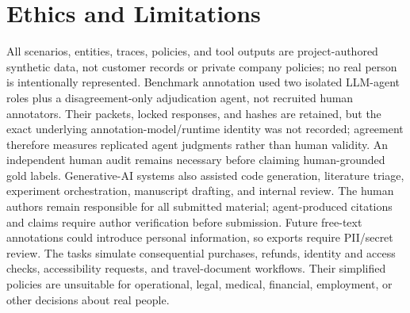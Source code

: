 \section{Ethics and Limitations}
\label{sec:ethics-limitations}

All scenarios, entities, traces, policies, and tool outputs are project-authored
synthetic data, not customer records or private company policies; no real person
is intentionally represented. Benchmark annotation used two isolated LLM-agent
roles plus a disagreement-only adjudication agent, not recruited human
annotators. Their packets, locked responses, and hashes are retained, but the
exact underlying annotation-model/runtime identity was not recorded; agreement
therefore measures replicated agent judgments rather than human validity. An
independent human audit remains necessary before claiming human-grounded gold
labels. Generative-AI systems also assisted code generation, literature triage,
experiment orchestration, manuscript drafting, and internal review. The human
authors remain responsible for all submitted material; agent-produced citations
and claims require author verification before submission. Future free-text
annotations could introduce personal information, so exports require PII/secret
review. The tasks
simulate consequential purchases, refunds, identity and access checks,
accessibility requests, and travel-document workflows. Their simplified policies
are unsuitable for operational, legal, medical, financial, employment, or other
decisions about real people.

